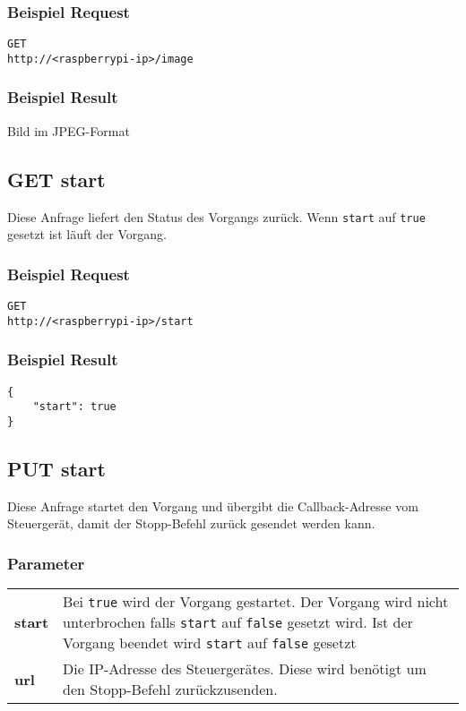 \subsubsection{Beispiel Request}

\texttt{GET} \\
\texttt{http://<raspberrypi-ip>/image}

\subsubsection{Beispiel Result}

Bild im JPEG-Format

\subsection{GET start}

Diese Anfrage liefert den Status des Vorgangs zurück. Wenn \texttt{start} auf \texttt{true} gesetzt ist läuft der Vorgang.

\subsubsection{Beispiel Request}

\texttt{GET} \\
\texttt{http://<raspberrypi-ip>/start}

\subsubsection{Beispiel Result}

\begin{lstlisting}[caption=GET start Result, tabsize=2]
{
	"start": true
}
\end{lstlisting}

\subsection{PUT start}

Diese Anfrage startet den Vorgang und übergibt die Callback-Adresse vom Steuergerät, damit der Stopp-Befehl zurück gesendet werden kann.

\subsubsection{Parameter}

\begin{tabular}{l p{16cm}}
	\textbf{start} & Bei \texttt{true} wird der Vorgang gestartet. Der Vorgang wird nicht unterbrochen falls \texttt{start} auf \texttt{false} gesetzt wird. Ist der Vorgang beendet wird \texttt{start} auf \texttt{false} gesetzt \\
	\textbf{url} & Die IP-Adresse des Steuergerätes. Diese wird benötigt um den Stopp-Befehl zurückzusenden.
\end{tabular}


